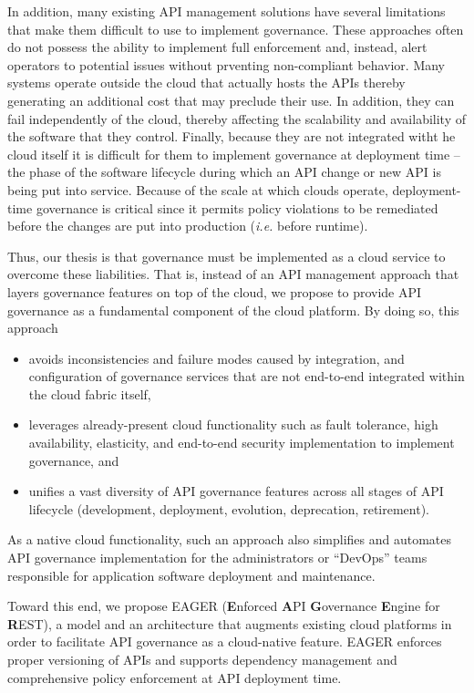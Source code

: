 In addition, many existing
API management solutions have several limitations that make them difficult to
use to implement governance.  
These approaches often 
do not possess the ability to implement full enforcement and, instead, alert
operators to potential issues without prventing non-compliant behavior.
Many systems operate outside the 
cloud that actually hosts the APIs thereby generating an additional cost that
may preclude their use.
In addition, they can fail independently of the cloud, thereby affecting 
the scalability and availability of the software that they control.
Finally, because they are not integrated witht he cloud itself it is difficult
for them to
implement governance at deployment time -- the phase of the software lifecycle
during which an API change or new API is being put into service.
Because of the scale at which clouds operate, deployment-time governance is
critical since it permits policy violations to be remediated before the
changes are put into production ({\em i.e.} before runtime).

Thus, our thesis is that governance must be implemented as a cloud service to
overcome these liabilities.
That is, instead of an API management
approach that layers governance features on top of the cloud, 
we propose to provide API governance as a fundamental component of the cloud
platform.  By doing so, this approach
\begin{itemize}
\item avoids inconsistencies and failure modes caused  
by integration, and configuration of governance services that are not
end-to-end integrated within the cloud fabric itself, 
\item leverages already-present cloud functionality such as fault tolerance,
high availability, elasticity, and end-to-end security implementation to
implement governance, and
\item unifies a vast diversity of API
governance features across all stages of API lifecycle
(development, deployment, evolution, deprecation, retirement). 
\end{itemize}
As a native cloud functionality, such an
approach also simplifies and automates API governance implementation for
the administrators or ``DevOps'' teams responsible for application
software deployment and
maintenance.

Toward this end, we propose EAGER ({\bf E}nforced {\bf A}PI {\bf G}overnance
{\bf E}ngine for {\bf R}EST), a model and an architecture that augments existing
cloud platforms in order to facilitate API governance as a 
cloud-native feature. EAGER enforces proper versioning of APIs and supports dependency 
management and comprehensive policy enforcement at API deployment time. 

